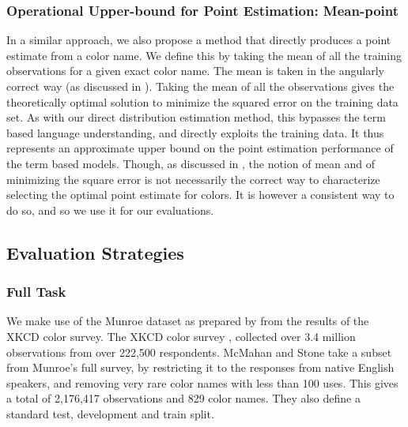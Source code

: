 \documentclass[]{book}
\newcommand{\parencite}{\citep}
\newcommand{\textcite}{\citet}
\begin{document}
\subsubsection{Operational Upper-bound for Point Estimation: Mean-point}
In a similar approach, we also propose a method that directly produces a point estimate from a color name.
We define this by taking the mean of all the training observations for a given exact color name.
The mean is taken in the angularly correct way (as discussed in ).
Taking the mean of all the observations gives the theoretically optimal solution to minimize the squared error on the training data set.
As with our direct distribution estimation method, this bypasses the term based language understanding, and directly exploits the training data.
It thus represents an approximate upper bound on the point estimation performance of the term based models.
Though, as discussed in , the notion of mean and of minimizing the square error is not necessarily the correct way to characterize selecting the optimal point estimate for colors.
It is however a consistent way to do so, and so we use it for our evaluations.



\subsection{Evaluation Strategies}

\subsubsection{Full Task}
We make use of the  Munroe dataset as prepared by \textcite{mcmahan2015bayesian} from the results of the XKCD color survey.
The XKCD color survey \parencite{Munroe2010XKCDdataset}, collected over 3.4 million observations from over 222,500 respondents.
McMahan and Stone take a subset from Munroe's full survey, by restricting it to the responses from native English speakers, 
and removing very rare color names with less than 100 uses.
This gives a total of 2,176,417 observations and 829 color names. 
They also define a standard test, development and train split.
\end{document}

